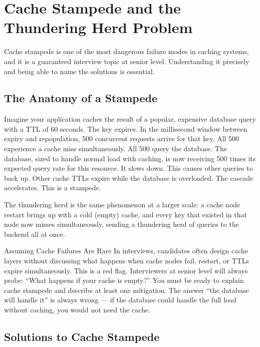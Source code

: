 \documentclass[11pt,a4paper]{article}
\begin{document}
\section{Cache Stampede and the Thundering Herd Problem}

Cache stampede is one of the most dangerous failure modes in caching systems, and it is a guaranteed interview topic at senior level. Understanding it precisely and being able to name the solutions is essential.

\subsection{The Anatomy of a Stampede}

Imagine your application caches the result of a popular, expensive database query with a TTL of 60 seconds. The key expires. In the millisecond window between expiry and repopulation, 500 concurrent requests arrive for that key. All 500 experience a cache miss simultaneously. All 500 query the database. The database, sized to handle normal load with caching, is now receiving 500 times its expected query rate for this resource. It slows down. This causes other queries to back up. Other cache TTLs expire while the database is overloaded. The cascade accelerates. This is a stampede.

The thundering herd is the same phenomenon at a larger scale: a cache node restart brings up with a cold (empty) cache, and every key that existed in that node now misses simultaneously, sending a thundering herd of queries to the backend all at once.

\begin{trapbox}{Assuming Cache Failures Are Rare}
In interviews, candidates often design cache layers without discussing what happens when cache nodes fail, restart, or TTLs expire simultaneously. This is a red flag. Interviewers at senior level will always probe: ``What happens if your cache is empty?'' You must be ready to explain cache stampede and describe at least one mitigation. The answer ``the database will handle it'' is always wrong --- if the database could handle the full load without caching, you would not need the cache.
\end{trapbox}

\subsection{Solutions to Cache Stampede}
\end{document}
